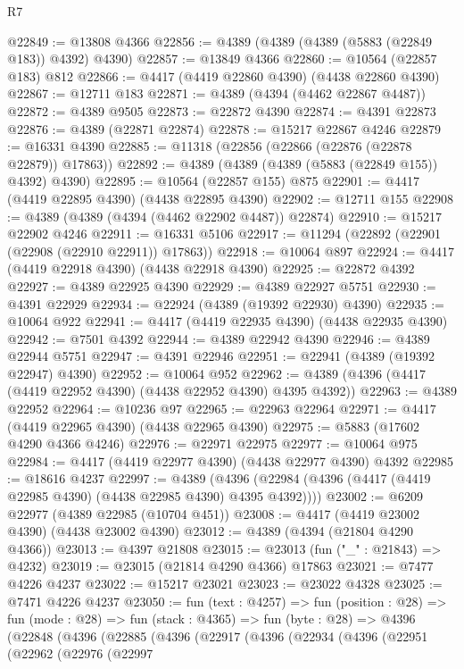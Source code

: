 \begin{lexlean}{R7}
\begin{coremodule}
@22849 := @13808 @4366
@22856 := @4389 (@4389 (@4389 (@5883 (@22849 @183)) @4392) @4390)
@22857 := @13849 @4366
@22860 := @10564 (@22857 @183) @812
@22866 := @4417 (@4419 @22860 @4390) (@4438 @22860 @4390)
@22867 := @12711 @183
@22871 := @4389 (@4394 (@4462 @22867 @4487))
@22872 := @4389 @9505
@22873 := @22872 @4390
@22874 := @4391 @22873
@22876 := @4389 (@22871 @22874)
@22878 := @15217 @22867 @4246
@22879 := @16331 @4390
@22885 := @11318 (@22856 (@22866 (@22876 (@22878 @22879)) @17863))
@22892 := @4389 (@4389 (@4389 (@5883 (@22849 @155)) @4392) @4390)
@22895 := @10564 (@22857 @155) @875
@22901 := @4417 (@4419 @22895 @4390) (@4438 @22895 @4390)
@22902 := @12711 @155
@22908 := @4389 (@4389 (@4394 (@4462 @22902 @4487)) @22874)
@22910 := @15217 @22902 @4246
@22911 := @16331 @5106
@22917 := @11294 (@22892 (@22901 (@22908 (@22910 @22911)) @17863))
@22918 := @10064 @897
@22924 := @4417 (@4419 @22918 @4390) (@4438 @22918 @4390)
@22925 := @22872 @4392
@22927 := @4389 @22925 @4390
@22929 := @4389 @22927 @5751
@22930 := @4391 @22929
@22934 := @22924 (@4389 (@19392 @22930) @4390)
@22935 := @10064 @922
@22941 := @4417 (@4419 @22935 @4390) (@4438 @22935 @4390)
@22942 := @7501 @4392
@22944 := @4389 @22942 @4390
@22946 := @4389 @22944 @5751
@22947 := @4391 @22946
@22951 := @22941 (@4389 (@19392 @22947) @4390)
@22952 := @10064 @952
@22962 := @4389 (@4396 (@4417 (@4419 @22952 @4390) (@4438 @22952 @4390) @4395 @4392))
@22963 := @4389 @22952
@22964 := @10236 @97
@22965 := @22963 @22964
@22971 := @4417 (@4419 @22965 @4390) (@4438 @22965 @4390)
@22975 := @5883 (@17602 @4290 @4366 @4246)
@22976 := @22971 @22975
@22977 := @10064 @975
@22984 := @4417 (@4419 @22977 @4390) (@4438 @22977 @4390) @4392
@22985 := @18616 @4237
@22997 := @4389
    (@4396 (@22984 (@4396 (@4417 (@4419 @22985 @4390) (@4438 @22985 @4390) @4395 @4392))))
@23002 := @6209 @22977 (@4389 @22985 (@10704 @451))
@23008 := @4417 (@4419 @23002 @4390) (@4438 @23002 @4390)
@23012 := @4389 (@4394 (@21804 @4290 @4366))
@23013 := @4397 @21808
@23015 := @23013 (fun ("_" : @21843) => @4232)
@23019 := @23015 (@21814 @4290 @4366) @17863
@23021 := @7477 @4226 @4237
@23022 := @15217 @23021
@23023 := @23022 @4328
@23025 := @7471 @4226 @4237
@23050 := fun (text : @4257) =>
  fun (position : @28) =>
  fun (mode : @28) =>
  fun (stack : @4365) =>
  fun (byte : @28) =>
  @4396
    (@22848
      (@4396
        (@22885
          (@4396
            (@22917
              (@4396
                (@22934
                  (@4396
                    (@22951
                      (@22962
                        (@22976
                          (@22997

\end{coremodule}
\end{lexlean}
